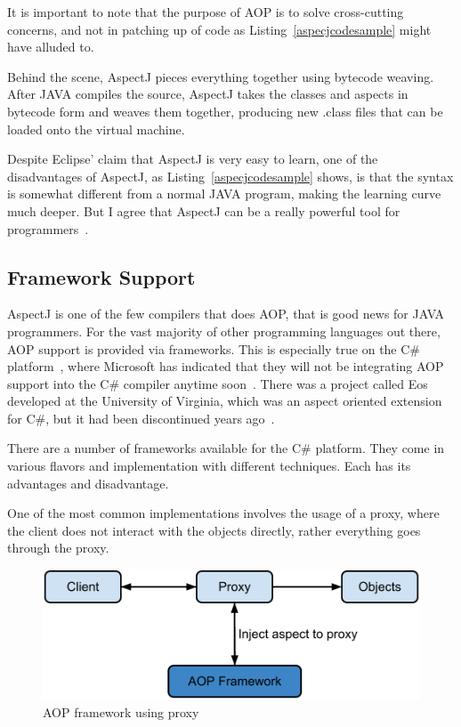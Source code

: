 It is important to note that the purpose of AOP is to solve cross-cutting concerns, and not in patching up of code as Listing~\ref{aspecjcodesample} might have alluded to.

Behind the scene, AspectJ pieces everything together using bytecode weaving. After JAVA compiles the source, AspectJ takes the classes and aspects in bytecode form and weaves them together, producing new .class files that can be loaded onto the virtual machine.

Despite Eclipse' claim that AspectJ is very easy to learn, one of the disadvantages of AspectJ, as Listing~\ref{aspecjcodesample} shows, is that the syntax is somewhat different from a normal JAVA program, making the learning curve much deeper. But I agree that AspectJ can be a really powerful tool for programmers~\cite{aspectj_text}.

\subsection{Framework Support}

AspectJ is one of the few compilers that does AOP, that is good news for JAVA programmers. For the vast majority of other programming languages out there, AOP support is provided via frameworks. This is especially true on the C\# platform~\cite{aopcs}, where Microsoft has indicated that they will not be integrating AOP support into the C\# compiler anytime soon~\cite{mastermind_text}. There was a project called Eos developed at the University of Virginia, which was an aspect oriented extension for C\#, but it had been discontinued years ago~\cite{eos_site, eos}.

There are a number of frameworks available for the C\# platform. They come in various flavors and implementation with different techniques. Each has its advantages and disadvantage.

One of the most common implementations involves the usage of a proxy, where the client does not interact with the objects directly, rather everything goes through the proxy.

\begin{figure}[here]
  \includegraphics[scale=0.70]{proxy.png}
  \centering
  \caption{AOP framework using proxy\label{proxy_model}}
\end{figure}


